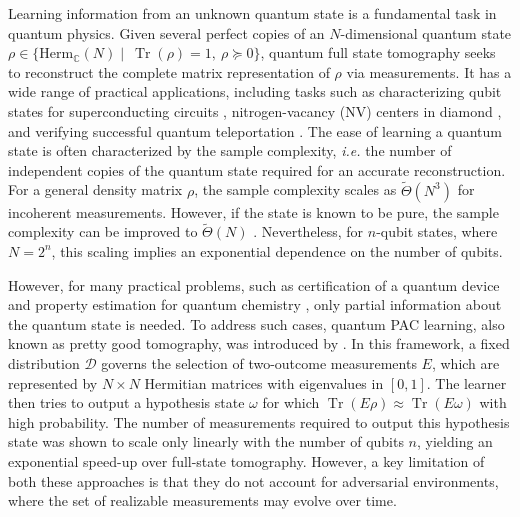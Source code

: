 Learning information from an unknown quantum state is a fundamental task in quantum physics. Given several perfect copies of an $N$-dimensional quantum state $\rho \in \{\mathrm{Herm}_{\mathbb{C}} (N)\mid \ \operatorname{Tr}(\rho) = 1, \ \rho \succeq 0\}$, quantum full state tomography seeks to reconstruct the complete matrix representation of $\rho$ via measurements. It has a wide range of practical applications, including tasks such as characterizing qubit states for superconducting circuits \citep{PhysRevLett.100.247001}, nitrogen-vacancy (NV) centers in diamond \citep{doi:10.1126/science.1189075}, and verifying successful quantum teleportation \citep{Bouwmeester_1997}. The ease of learning a quantum state is often characterized by the sample complexity, \textit{i.e.} the number of independent copies of the quantum state required for an accurate reconstruction. For a general density matrix $\rho$, the sample complexity scales as $\tilde{\Theta}(N^3)$ for incoherent measurements. However, if the state is known to be pure, the sample complexity can be improved to $\tilde{\Theta}(N)$ \citep{kueng2014lowrankmatrixrecovery, harrow16sampletomography, chen2023doesadaptivityhelpquantum} . Nevertheless, for $n$-qubit states, where $N = 2^n$, this scaling implies an exponential dependence on the number of qubits.


However, for many practical problems, such as certification of a quantum device \citep{Gross_2010, Flammia_2011, eisert2020quantumcertification} and property estimation for quantum chemistry \citep{Huang_2021, Wu2023overlappedgrouping, zhang2023composite, guo2024estimatingpropertiesquantumstate, Miller_2024}, only partial information about the quantum state is needed. To address such cases, quantum PAC learning, also known as pretty good tomography, was introduced by \citet{aaronson2007learnability}. In this framework, a fixed distribution $\mathcal{D}$ governs the selection of two-outcome measurements $E$, which are represented by $N\times N$ Hermitian matrices with eigenvalues in $[0,1]$. The learner then tries to output a hypothesis state $\omega$ for which $\operatorname{Tr} (E \rho) \approx \operatorname{Tr} (E \omega)$ with high probability. The number of measurements required to output this hypothesis state was shown to scale only linearly with the number of qubits $n$, yielding an exponential speed-up over full-state tomography. However, a key limitation of both these approaches is that they do not account for adversarial environments, where the set of realizable measurements may evolve over time.
 


